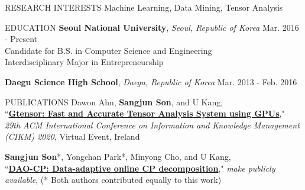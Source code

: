 \documentclass[10pt]{resume} %
\begin{document}


\begin{rSection}{RESEARCH INTERESTS}
Machine Learning, Data Mining, Tensor Analysis
\end{rSection}
%
\begin{rSection}{EDUCATION}
{\bf Seoul National University}, \textit{Seoul, Republic of Korea} \hfill Mar. 2016 - Present \\
Candidate for B.S. in Computer Science and Engineering \\
Interdisciplinary Major in Entrepreneurship

{\bf Daegu Science High School}, \textit{Daegu, Republic of Korea} \hfill Mar. 2013 - Feb. 2016
\end{rSection}

\begin{rSection}{PUBLICATIONS}
Dawon Ahn, \textbf{Sangjun Son}, and U Kang, \\
	``\href{https://dl.acm.org/doi/abs/10.1145/3340531.3417413}
	{\textbf{Gtensor: Fast and Accurate Tensor Analysis System using GPUs}}," \\
	\textit{29th ACM International Conference on 
	Information and Knowledge Management (CIKM) 2020}, Virtual Event, Ireland
	
\textbf{Sangjun Son}*, Yongchan Park*, Minyong Cho, and U Kang, \\ 
	``\href{https://datalab.snu.ac.kr/dao-cp/}
	{\textbf{DAO-CP: Data-adaptive online CP decomposition}}," 
    \textit{make publicly available}, (* Both authors contributed equally to this work)
\end{rSection}
\end{document}

